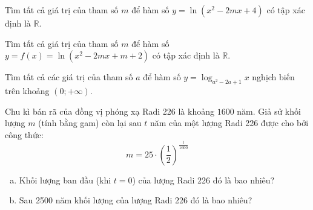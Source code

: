 \begin{bt}
	Tìm tất cả giá trị của tham số $m$ để hàm số $y=\ln \left(  x^2-2mx+4 \right)$ có tập xác định là $\mathbb{R}$.
\end{bt} 

\begin{bt}
	Tìm tất cả giá trị của tham số $m$ để hàm số $y=f(x)=\ln (x^2-2mx+m+2)$ có tập xác định là $\mathbb{R}$.
\end{bt} 

\begin{bt}%
	Tìm tất cả các giá trị của tham số $a$ để hàm số $y=\log_{a^2-2a+1}x$ nghịch biến trên khoảng $(0;+\infty)$.
\end{bt} 

\begin{bt}%
	Chu kì bán rã của đồng vị phóng xạ Radi 226 là khoảng $1600$ năm. Giả sử khối lượng $m$ (tính bằng gam) còn lại sau $t$ năm của một lượng Radi 226 được cho bởi công thức:
	$$
	m=25 \cdot\left(\frac{1}{2}\right)^{\tfrac{t}{1600}}
	$$
	\begin{enumerate}[a)]
		\item Khối lượng ban đầu (khi $t=0$) của lượng Radi 226 đó là bao nhiêu?
		\item Sau 2500 năm khối lượng của lượng Radi 226 đó là bao nhiêu?
	\end{enumerate}
\end{bt} 
